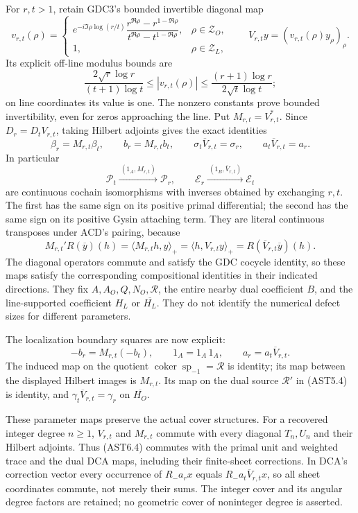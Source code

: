 For \(r,t>1\), retain GDC3's bounded invertible diagonal map \[
v_{r,t}(\rho)=
\begin{cases}
e^{-i\Im\rho\log(r/t)}
\dfrac{r^{\Re\rho}-r^{1-\Re\rho}}
{t^{\Re\rho}-t^{1-\Re\rho}},&\rho\in\mathscr Z_O,\\
1,&\rho\in\mathscr Z_L,
\end{cases}
\qquad V_{r,t}y=(v_{r,t}(\rho)y_\rho)_\rho.
\tag{AST6.1}
\] Its explicit off-line modulus bounds are \[
\frac{2\sqrt r\log r}{(t+1)\log t}
\le |v_{r,t}(\rho)|
\le\frac{(r+1)\log r}{2\sqrt t\log t};
\tag{AST6.2}
\] on line coordinates its value is one. The nonzero constants prove
bounded invertibility, even for zeros approaching the line. Put
\(M_{r,t}=V_{r,t}^*\). Since \(D_r=D_tV_{r,t}\), taking Hilbert adjoints
gives the exact identities \[
\beta_r=M_{r,t}\beta_t,\qquad
b_r=M_{r,t}b_t,
\qquad \sigma_t\overline V_{r,t}=\sigma_r,
\qquad a_t\overline V_{r,t}=a_r.
\tag{AST6.3}
\] In particular \[
\mathscr P_t\xrightarrow{\ (1_A,M_{r,t})\ }\mathscr P_r,
\qquad
\mathscr E_r\xrightarrow{\ (1_B,\overline V_{r,t})\ }\mathscr E_t
\tag{AST6.4}
\] are continuous cochain isomorphisms with inverses obtained by
exchanging \(r,t\). The first has the same sign on its positive primal
differential; the second has the same sign on its positive Gysin
attaching term. They are literal continuous transposes under ACD's
pairing, because \[
M_{r,t}'R(\overline y)(h)
=\langle M_{r,t}h,y\rangle_+
=\langle h,V_{r,t}y\rangle_+
=R(\overline V_{r,t}\overline y)(h).
\tag{AST6.5}
\] The diagonal operators commute and satisfy the GDC cocycle identity,
so these maps satisfy the corresponding compositional identities in
their indicated directions. They fix \(A,A_O,Q,N_O,\mathcal R\), the
entire nearby dual coefficient \(B\), and the line-supported coefficient
\(H_L\) or \(\overline{H_L}\). They do not identify the numerical defect
sizes for different parameters.

The localization boundary squares are now explicit: \[
-b_r=M_{r,t}(-b_t),\qquad
1_A=1_A\,1_A,\qquad
a_r=a_t\overline V_{r,t}.
\tag{AST6.6}
\] The induced map on the quotient
\(\operatorname{coker}\operatorname{sp}_{-1}=\mathcal R\) is identity;
its map between the displayed Hilbert images is \(M_{r,t}\). Its map on
the dual source \(\mathcal R'\) in (AST5.4) is identity, and
\(\gamma_t\overline V_{r,t}=\gamma_r\) on \(\overline{H_O}\).

These parameter maps preserve the actual cover structures. For a
recovered integer degree \(n\ge1\), \(V_{r,t}\) and \(M_{r,t}\) commute
with every diagonal \(T_n,U_n\) and their Hilbert adjoints. Thus
(AST6.4) commutes with the primal unit and weighted trace and the dual
DCA maps, including their finite-sheet corrections. In DCA's correction
vector every occurrence of \(R_-a_r x\) equals
\(R_-a_t\overline V_{r,t}x\), so all sheet coordinates commute, not
merely their sums. The integer cover and its angular degree factors are
retained; no geometric cover of noninteger degree is asserted.

